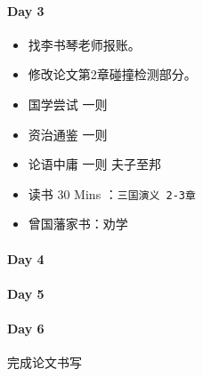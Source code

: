 \documentclass[UTF8,a4paper,8pt]{ctexart}
\begin{document}
 	 \paragraph{Day 3       \quad     }
	 	  \begin{itemize}[itemindent = 1em]
	 	  	\renewcommand\labelitemi{\makebox[0pt][l]{$\square$}\raisebox{.15ex}{\hspace{0.1em}$\checkmark$}}		
	 	  	
	 	  	\item 	 找李书琴老师报账。
	 	  	\item    修改论文第2章碰撞检测部分。
	 	  	
	 	  	
	 	  	\renewcommand\labelitemi{\makebox[0pt][l]{$\square$}\hspace{1em}}
	 	  	\item   国学尝试 一则
	 	  	\item 	资治通鉴 一则 
	 	  	\item 	论语中庸 一则 夫子至邦
	 	  	\item   读书  30 Mins	：\verb|三国演义 2-3章|
	 	  	\item   曾国藩家书：劝学
	 	  \end{itemize}
 	 \paragraph{Day 4       \quad     }
 	 \paragraph{Day 5       \quad     }
 	 \paragraph{Day 6       \quad     }
		 	完成论文书写
		 	
\end{document}
